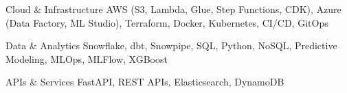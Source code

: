 

\begin{cvskills}

  \cvskill
    {Cloud \& Infrastructure} %
    {AWS (S3, Lambda, Glue, Step Functions, CDK), Azure (Data Factory, ML Studio), Terraform, Docker, Kubernetes, CI/CD, GitOps} %

  \cvskill
    {Data \& Analytics} %
    {Snowflake, dbt, Snowpipe, SQL, Python, NoSQL, Predictive Modeling, MLOps, MLFlow, XGBoost} %

  \cvskill
    {APIs \& Services} %
    {FastAPI, REST APIs, Elasticsearch, DynamoDB} %

\end{cvskills}
